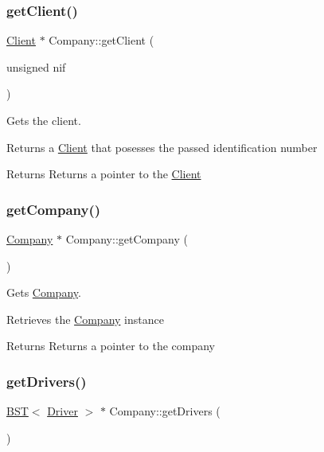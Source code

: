 \subsubsection{\texorpdfstring{get\+Client()}{getClient()}}
{\footnotesize\ttfamily \hyperlink{class_client}{Client} $\ast$ Company\+::get\+Client (\begin{DoxyParamCaption}\item[{unsigned}]{nif }\end{DoxyParamCaption})}



Gets the client. 

Returns a \hyperlink{class_client}{Client} that posesses the passed identification number

\begin{DoxyReturn}{Returns}
Returns a pointer to the \hyperlink{class_client}{Client} 
\end{DoxyReturn}
\mbox{\label{class_company_a453411f6ef4bab2e878867302fdcf484}} 
\subsubsection{\texorpdfstring{get\+Company()}{getCompany()}}
{\footnotesize\ttfamily \hyperlink{class_company}{Company} $\ast$ Company\+::get\+Company (\begin{DoxyParamCaption}{ }\end{DoxyParamCaption})\hspace{0.3cm}{\ttfamily [static]}}



Gets \hyperlink{class_company}{Company}. 

Retrieves the \hyperlink{class_company}{Company} instance

\begin{DoxyReturn}{Returns}
Returns a pointer to the company 
\end{DoxyReturn}
\mbox{\label{class_company_ac53325e1c17389979293dbc78398dc31}} 
\subsubsection{\texorpdfstring{get\+Drivers()}{getDrivers()}}
{\footnotesize\ttfamily \hyperlink{class_b_s_t}{B\+ST}$<$ \hyperlink{class_driver}{Driver} $>$ $\ast$ Company\+::get\+Drivers (\begin{DoxyParamCaption}{ }\end{DoxyParamCaption})}



